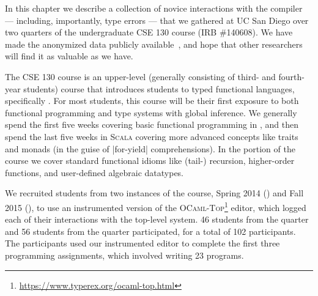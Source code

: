 In this chapter we describe a collection of novice interactions with the
\ocaml compiler --- including, importantly, type errors --- that we
gathered at UC San Diego over two quarters of the undergraduate CSE 130
course (IRB \#140608).
%
We have made the anonymized data publicly
available~\citep{Seidel2017-ko}, and hope that other researchers will
find it as valuable as we have.

The CSE 130 course is an upper-level (\ie generally consisting of third-
and fourth-year students) course that introduces students to typed
functional languages, specifically \ocaml.
%
For most students, this course will be their first exposure to both
functional programming and type systems with global inference.
%
We generally spend the first five weeks covering basic functional
programming in \ocaml, and then spend the last five weeks in
\textsc{Scala} covering more advanced concepts like traits and
monads (in the guise of |for-yield| comprehensions).
%
In the \ocaml portion of the course we cover standard functional idioms
like (tail-) recursion, higher-order functions, and user-defined
algebraic datatypes.

We recruited students from two instances of the course, Spring 2014
(\SPRING) and Fall 2015 (\FALL), to use an instrumented version of the
\textsc{OCaml-Top}\footnote{\url{https://www.typerex.org/ocaml-top.html}} editor, which logged each of their
interactions with the \ocaml top-level system.
%
46 students from the \SPRING quarter and 56 students from the \FALL
quarter participated, for a total of 102 participants.
%
The participants used our instrumented editor to complete the first
three programming assignments, which involved writing 23 \ocaml
programs.
%

